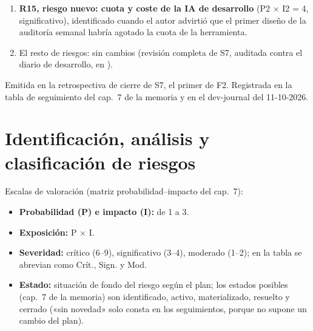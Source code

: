 \documentclass[11pt,a4paper]{article}
\begin{document}
\begin{enumerate}
  Además, el indicador clave saltó al cierre de S7: siete vulnerabilidades altas en dependencias de desarrollo sin resolver (todas por la versión de ESLint), que la auditoría de la integración continua no mira porque solo cubre las de producción.
  Medida modificada, con el triaje semanal de las propuestas de Dependabot y las alertas de seguridad activadas; e indicador precisado, para distinguir las vulnerabilidades de producción, que deben resolverse dentro del , de las de desarrollo, que no cortan la integración continua pero no pueden pasar del  siguiente.
  Probabilidad e impacto, sin cambios.
  Estado: \textbf{Activo}, con plazo de resolución al cierre de S8.
  \item \textbf{R15, riesgo nuevo: cuota y coste de la IA de desarrollo} (P2 \(\times\) I2 = 4, significativo), identificado cuando el autor advirtió que el primer diseño de la auditoría semanal habría agotado la cuota de la herramienta.
  \item El resto de riesgos: sin cambios (revisión completa de S7, auditada contra el diario de desarrollo, en ).
\end{enumerate}

Emitida en la retrospectiva de cierre de S7, el primer  de F2.
Registrada en la tabla de seguimiento del cap.~7 de la memoria y en el dev-journal del 11-10-2026.

\section{Identificación, análisis y clasificación de riesgos}

Escalas de valoración (matriz probabilidad--impacto del cap.~7):
\begin{itemize}
  \item \textbf{Probabilidad (P) e impacto (I):} de 1 a 3.
  \item \textbf{Exposición:} P \(\times\) I.
  \item \textbf{Severidad:} crítico (6–9), significativo (3–4), moderado (1–2); en la tabla se abrevian como Crít., Sign. y Mod.
  \item \textbf{Estado:} situación de fondo del riesgo según el plan; los estados posibles (cap.~7 de la memoria) son identificado, activo, materializado, resuelto y cerrado («sin novedad» solo consta en los seguimientos, porque no supone un cambio del plan).
\end{itemize}
\end{document}
